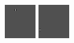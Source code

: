 \begin{figure}[ht]
\begin{center}
  \includegraphics[width=\columnwidth/11]{ch5/figures/4_Scaling_M.png}
  \includegraphics[width=\columnwidth/11]{ch5/figures/5_Scaling_M.png}

\end{center}
\end{figure}
